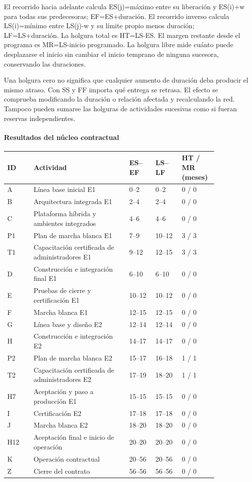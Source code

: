 El recorrido hacia adelante calcula ES(j)=máximo entre su liberación y ES(i)+w para todas sus predecesoras; EF=ES+duración. El recorrido inverso calcula LS(i)=mínimo entre LS(j)-w y su límite propio menos duración; LF=LS+duración. La holgura total es HT=LS-ES. El margen restante desde el programa es MR=LS-inicio programado. La holgura libre mide cuánto puede desplazarse el inicio sin cambiar el inicio temprano de ninguna sucesora, conservando las duraciones.

Una holgura cero no significa que cualquier aumento de duración deba producir el mismo atraso. Con SS y FF importa qué entrega se retrasa. El efecto se comprueba modificando la duración o relación afectada y recalculando la red. Tampoco pueden sumarse las holguras de actividades sucesivas como si fueran reservas independientes.

\paragraph{Resultados del núcleo contractual}

\begin{longtable}{@{}p{0.114\linewidth}p{0.401\linewidth}p{0.114\linewidth}p{0.114\linewidth}p{0.114\linewidth}@{}}
\toprule
\textbf{ID} & \textbf{Actividad} & \textbf{ES–EF} & \textbf{LS–LF} & \textbf{HT / MR (meses)} \\
\midrule
\endhead
\bottomrule
\endlastfoot
A & Línea base inicial E1 & 0–2 & 0–2 & 0 / 0 \\
B & Arquitectura integrada E1 & 2–4 & 2–4 & 0 / 0 \\
C & Plataforma híbrida y ambientes integrados & 4–6 & 4–6 & 0 / 0 \\
P1 & Plan de marcha blanca E1 & 7–9 & 10–12 & 3 / 3 \\
T1 & Capacitación certificada de administradores E1 & 9–12 & 12–15 & 3 / 3 \\
D & Construcción e integración final E1 & 6–10 & 6–10 & 0 / 0 \\
E & Pruebas de cierre y certificación E1 & 10–12 & 10–12 & 0 / 0 \\
F & Marcha blanca E1 & 12–15 & 12–15 & 0 / 0 \\
G & Línea base y diseño E2 & 12–14 & 12–14 & 0 / 0 \\
H & Construcción e integración E2 & 14–17 & 14–17 & 0 / 0 \\
P2 & Plan de marcha blanca E2 & 15–17 & 16–18 & 1 / 1 \\
T2 & Capacitación certificada de administradores E2 & 17–19 & 18–20 & 1 / 1 \\
H7 & Aceptación y paso a producción E1 & 15–15 & 15–15 & 0 / 0 \\
I & Certificación E2 & 17–18 & 17–18 & 0 / 0 \\
J & Marcha blanca E2 & 18–20 & 18–20 & 0 / 0 \\
H12 & Aceptación final e inicio de operación & 20–20 & 20–20 & 0 / 0 \\
K & Operación contractual & 20–56 & 20–56 & 0 / 0 \\
Z & Cierre del contrato & 56–56 & 56–56 & 0 / 0 \\
\end{longtable}

